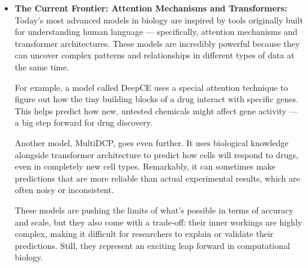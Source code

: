 \documentclass[twocolumn]{article}
\begin{document}
\begin{itemize}
        \item \textbf{The Current Frontier: Attention Mechanisms and Transformers: }
        \\
         Today’s most advanced models in biology are inspired by tools originally built for understanding human language — specifically, attention mechanisms and transformer architectures. These models are incredibly powerful because they can uncover complex patterns and relationships in different types of data at the same time\cite{wu2022deep}.
    
        For example, a model called DeepCE uses a special attention technique to figure out how the tiny building blocks of a drug interact with specific genes. This helps predict how new, untested chemicals might affect gene activity — a big step forward for drug discovery\cite{pham2021deep}.
    
        Another model, MultiDCP, goes even further. It uses biological knowledge alongside transformer architecture to predict how cells will respond to drugs, even in completely new cell types. Remarkably, it can sometimes make predictions that are more reliable than actual experimental results, which are often noisy or inconsistent\cite{wu2022deep}.
    
        These models are pushing the limits of what’s possible in terms of accuracy and scale, but they also come with a trade-off: their inner workings are highly complex, making it difficult for researchers to explain or validate their predictions. Still, they represent an exciting leap forward in computational biology\cite{chow2022predicting}.
\end{itemize}
\end{document}
